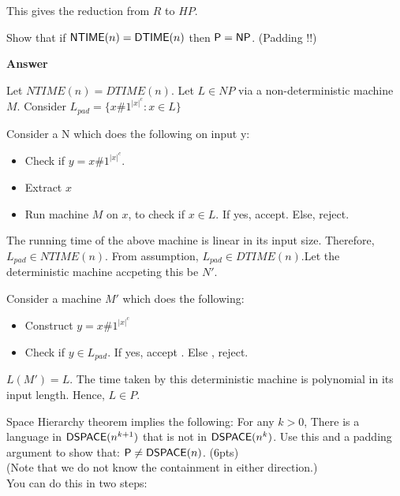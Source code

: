 \documentclass[addpoints,12pt]{exam}
\begin{document}
\begin{questions}
\begin{parts}
This gives the reduction from $R$ to $HP$.

\end{parts}

\question[5] 
Show that if ${\mathsf{NTIME}}(n) = {\mathsf{DTIME}}(n)$ then ${\mathsf{P}} = {\mathsf{NP}}$. (Padding !!)

\textbf{Answer} \newline

Let $NTIME(n) = DTIME(n)$. \newline
Let $L \in NP$ via a non-deterministic machine $M$. \newline
Consider $L_{pad} = \{x\#1^{|x|^{c}} : x \in L\}$ \newline

Consider a N which does the following on input y:
\begin{itemize}
 \item Check if $y=x\#1^{|x|^{c}}$.
 \item Extract $x$
 \item Run machine $M$ on $x$, to check if $x \in L $. If yes, accept. Else, reject.
\end{itemize}

The running time of the above machine is linear in its input size. Therefore, $L_{pad} \in NTIME(n)$. \newline
From assumption, $L_{pad} \in DTIME(n)$.Let the deterministic machine accpeting this be $N'$.

Consider a machine $M'$ which does the following: \newline
\begin{itemize}
 \item Construct $y=x\#1^{|x|^{c}}$
 \item Check if $y \in L_{pad}$. If yes, accept . Else , reject.
\end{itemize}

$L(M') = L$. The time taken by this deterministic machine is polynomial in its input length. Hence, $L \in P$.

\question[10]
 Space Hierarchy theorem implies the following: For any $k >
0$, There is a language in ${\mathsf{DSPACE}}(n^{k+1})$ that is not in
${\mathsf{DSPACE}}(n^k)$. Use this and a padding argument to show that: ${\mathsf{P}}
\neq {\ensuremath{\mathsf{DSPACE}}}(n)$. (6pts) \\ (Note that we do not know the containment
in either direction.) \\ You can do this in two steps:
\end{questions}
\end{document}
